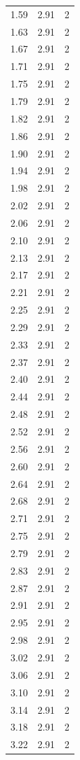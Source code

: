 \begin{longtable}{lrr}
  1.59 & 2.91 & 2 \\
  1.63 & 2.91 & 2 \\
  1.67 & 2.91 & 2 \\
  1.71 & 2.91 & 2 \\
  1.75 & 2.91 & 2 \\
  1.79 & 2.91 & 2 \\
  1.82 & 2.91 & 2 \\
  1.86 & 2.91 & 2 \\
  1.90 & 2.91 & 2 \\
  1.94 & 2.91 & 2 \\
  1.98 & 2.91 & 2 \\
  2.02 & 2.91 & 2 \\
  2.06 & 2.91 & 2 \\
  2.10 & 2.91 & 2 \\
  2.13 & 2.91 & 2 \\
  2.17 & 2.91 & 2 \\
  2.21 & 2.91 & 2 \\
  2.25 & 2.91 & 2 \\
  2.29 & 2.91 & 2 \\
  2.33 & 2.91 & 2 \\
  2.37 & 2.91 & 2 \\
  2.40 & 2.91 & 2 \\
  2.44 & 2.91 & 2 \\
  2.48 & 2.91 & 2 \\
  2.52 & 2.91 & 2 \\
  2.56 & 2.91 & 2 \\
  2.60 & 2.91 & 2 \\
  2.64 & 2.91 & 2 \\
  2.68 & 2.91 & 2 \\
  2.71 & 2.91 & 2 \\
  2.75 & 2.91 & 2 \\
  2.79 & 2.91 & 2 \\
  2.83 & 2.91 & 2 \\
  2.87 & 2.91 & 2 \\
  2.91 & 2.91 & 2 \\
  2.95 & 2.91 & 2 \\
  2.98 & 2.91 & 2 \\
  3.02 & 2.91 & 2 \\
  3.06 & 2.91 & 2 \\
  3.10 & 2.91 & 2 \\
  3.14 & 2.91 & 2 \\
  3.18 & 2.91 & 2 \\
  3.22 & 2.91 & 2 \\

\end{longtable}

